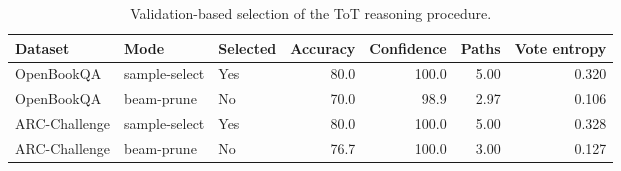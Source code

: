 \begin{table}[H]
\centering
\caption{Validation-based selection of the ToT reasoning procedure.}
\label{tab:tot-selection}
\begin{tabular}{lllrrrr}
\toprule
Dataset & Mode & Selected & Accuracy & Confidence & Paths & Vote entropy \\
\midrule
OpenBookQA & sample-select & Yes & 80.0 & 100.0 & 5.00 & 0.320 \\
OpenBookQA & beam-prune & No & 70.0 & 98.9 & 2.97 & 0.106 \\
ARC-Challenge & sample-select & Yes & 80.0 & 100.0 & 5.00 & 0.328 \\
ARC-Challenge & beam-prune & No & 76.7 & 100.0 & 3.00 & 0.127 \\
\bottomrule
\end{tabular}
\end{table}
